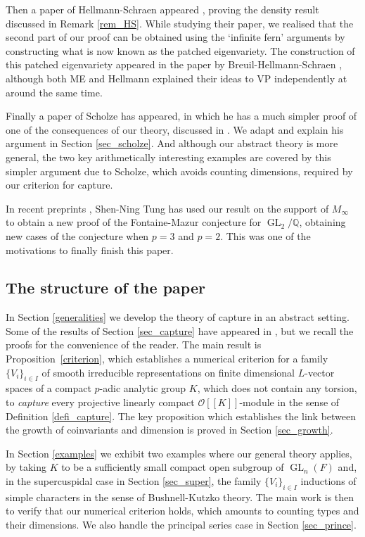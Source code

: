 \documentclass[JEP,XML,SOM,Unicode,NoEqCountersInSection]{cedram}
\let\mathcal\mathscr
\theoremstyle{definition}
\DeclareMathOperator{\GL}{GL}
\newcommand{\br}[1]{[\![#1]\!]}
\newcommand{\QQ}{\mathbb Q}
\newcommand{\cO}{\mathcal{O}}
\begin{document}
Then a paper of Hellmann-Schraen appeared \cite{HS}, proving the density result
discussed in Remark \ref{rem_HS}. While studying their paper, we realised that the second part of our proof
can be obtained using the `infinite fern' arguments by constructing what is now known as the patched
eigenvariety. The construction of this patched eigenvariety appeared in the paper by
Breuil-Hellmann-Schraen \cite{BHS}, although both ME and Hellmann explained their ideas
to VP independently at around the same time.

Finally a paper of Scholze \cite{scholze} has appeared, in which he has a much simpler proof of one of the consequences of our theory, discussed in \cite[3.3.2]{matt_icm}. We adapt and explain his argument in Section \ref{sec_scholze}. And although our abstract theory is more general, the two key arithmetically interesting examples are covered by this simpler argument due to Scholze, which avoids counting dimensions, required by our criterion for capture.

In recent preprints \cite{shen-ning}, \cite{shen-ning2} Shen-Ning Tung has used our result on the support
of $M_{\infty}$ to obtain a new proof of the Fontaine-Mazur conjecture for $\GL_2/\QQ$,
obtaining new cases of the conjecture when $p=3$ and $p=2$. This was one of the motivations to finally finish this paper.

\subsection{The structure of the paper} In Section \ref{generalities} we develop the theory of capture in
an abstract setting. Some of the results of Section \ref{sec_capture} have appeared in \cite[\S 2.4]{CDP}, but
we recall the proofs for the convenience of the reader. The main result is \hbox{Proposition \ref{criterion}},
which establishes a numerical criterion for a family $\{V_i\}_{i\in I}$ of smooth irreducible representations on finite
dimensional $L$-vector spaces of a compact $p$-adic analytic group $K$, which does not contain any torsion, to \textit{capture} every projective linearly compact $\cO\br{K}$-module in the sense of
Definition \ref{defi_capture}. The key proposition which establishes the link between the
growth of coinvariants and dimension is proved in Section \ref{sec_growth}.

In Section \ref{examples} we exhibit two examples where our general theory applies, by taking $K$
to be a sufficiently small compact open subgroup of $\GL_n(F)$ and, in the supercuspidal case in Section \ref{sec_super}, the family $\{V_i\}_{i\in I}$ inductions of simple characters in the sense of Bushnell-Kutzko theory. The main
work is then to verify that our numerical criterion holds, which amounts to counting types and their dimensions. We also handle the principal series case in Section \ref{sec_prince}.
\end{document}
